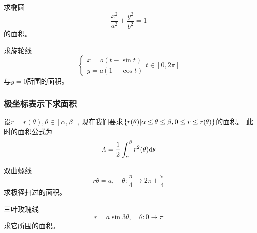 \begin{example}
    求椭圆
    \begin{equation*}
        \frac{x^2}{a^2} + \frac{y^2}{b^2} = 1
    \end{equation*}
    的面积。
\end{example}
\begin{solution}
    
\end{solution}

\begin{example}
    求旋轮线
    \begin{equation*}
        \begin{cases}
            x = a(t - \sin t) \\
            y = a(1 - \cos t)
        \end{cases}
        t \in [0, 2\pi]
    \end{equation*}
    与$y = 0$所围的面积。
\end{example}
\begin{solution}
    
\end{solution}

\subsubsection{极坐标表示下求面积}
设$r = r(\theta), \theta \in [\alpha, \beta]$, 现在我们要求$\left\{ r(\theta) | \alpha \le \theta \le \beta, 0 \le r \le r(\theta)\right\}$的面积。
此时的面积公式为
\begin{equation*}
    A = \frac{1}{2}\int_\alpha^\beta r^2(\theta) \mathrm{d} \theta
\end{equation*}

\begin{example}
    双曲螺线
    \begin{equation*}
        r\theta = a, \quad \theta:\frac{\pi}{4} \to 2\pi + \frac{\pi}{4}
    \end{equation*}
    求极径扫过的面积。
\end{example}
\begin{solution}
    
\end{solution}

\begin{example}
    三叶玫瑰线
    \begin{equation*}
        r = a\sin 3\theta, \quad \theta: 0 \to \pi 
    \end{equation*}
    求它所围的面积。
\end{example}
\begin{solution}
    
\end{solution}

